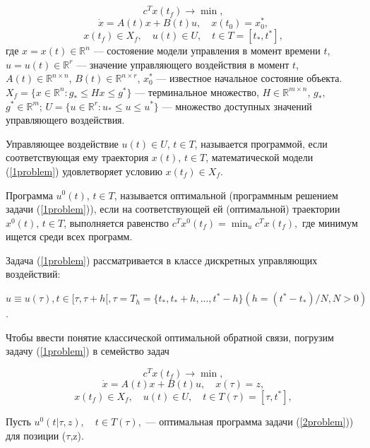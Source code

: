 \begin{equation} \label{1problem}
    c^Tx(t_f)\to \min,
    \end{equation}
$$
    \dot{x}=A(t)x+B(t)u,\quad x(t_0)=x_0^*,
    $$
$$
    x(t_f) \in X_f,\quad  u(t)\in U, \quad  t\in T = [t_*, t^*],
    $$
где  $x = x(t)\in \mathbb{R}^n$ — состояение модели управления в момент времени $t$,
$u = u(t)\in \mathbb{R}^r$ — значение управляющего воздействия в момент $t$, 
$A(t)\in \mathbb{R}^{n\times n}$,
$B(t)\in \mathbb{R}^{n\times r}$,
$x_0^*$ — известное начальное состояние объекта.
$X_f=\{x\in \mathbb{R}^n: g_*\leq Hx \leq g^*\}$ --- терминальное
множество, $H\in \mathbb{R}^{m\times n}$, $g_*,$ $g^* \in \mathbb{R}^m$;
$U=\{u\in \mathbb{R}^r: u_*\le u\le u^*\}$ --- множество доступных значений
управляющего воздействия.

\begin{definition}  Управляющее воздействие $u(t)\in U$, $t\in T$, называется программой, если соответствующая ему
траектория $x(t)$, $t\in T$, математической модели (\ref{1problem}) удовлетворяет
условию $x(t_f)\in X_f$.
\end{definition}

\begin{definition}  Программа $u^0(t)$, $t\in T$,
называется оптимальной (программным решением задачи (\ref{1problem})), если на соответствующей ей (оптимальной) траектории $x^0(t)$, $t\in T$, выполняется равенство $c^Tx^0(t_f) = \min_u c^Tx(t_f),$ где минимум ищется среди всех программ. 
\end{definition}

Задача (\ref{1problem}) рассматривается в классе дискретных управляющих воздействий:

$u\equiv u(\tau), t\in [ \tau,\tau + h[, \tau = T_h = \{t_*,t_* + h,...,t^* - h\} (h = (t^* - t_*)/N, N > 0)$.

Чтобы ввести понятие классической оптимальной обратной связи, погрузим задачу (\ref{1problem}) в семейство задач

\begin{equation} \label{2problem}
    c^Tx(t_f)\to \min,
    \end{equation}
$$
    \dot{x}=A(t)x+B(t)u,\quad  x(\tau) = z,
    $$
$$
    x(t_f) \in X_f,\quad  u(t)\in U, \quad  t\in T(\tau) = [\tau, t^*],
    $$
    
Пусть $u^0(t|\tau,z),\quad t\in T(\tau),$ — оптимальная программа задачи (\ref{2problem})) для позиции ($\tau$,z).

